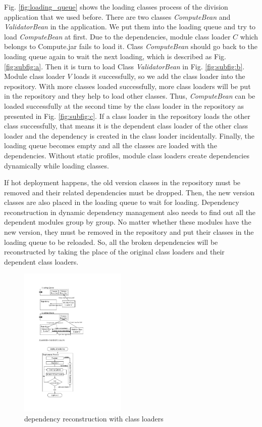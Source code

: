 \documentclass[conference]{IEEEtran}
\begin{document}
Fig. \ref{fig:loading_queue} shows the loading classes process of the division application that we used before. 
There are two classes \emph{ComputeBean} and \emph{ValidatorBean} in the application. 
We put them into the loading queue and try to load \emph{ComputeBean} at first. 
Due to the dependencies, module class loader $C$ which belongs to Compute.jar fails to load it. 
Class \emph{ComputeBean} should go back to the loading queue again to wait the next loading, which is described as Fig. \ref{fig:subfig:a}. 
Then it is turn to load Class \emph{ValidatorBean} in Fig. \ref{fig:subfig:b}. 
Module class loader $V$ loads it successfully, so we add the class loader into the repository. 
With more classes loaded successfully, more class loaders will be put in the repository and they help to load other classes. 
Thus, \emph{ComputeBean} can be loaded successfully at the second time by the class loader in the repository as presented in Fig. \ref{fig:subfig:c}.
If a class loader in the repository loads the other class successfully, that means it is the dependent class loader of the other class loader and the dependency is created in the class loader incidentally. 
Finally, the loading queue becomes empty and all the classes are loaded with the dependencies.
Without static profiles, module class loaders create dependencies dynamically while loading classes.

If hot deployment happens, the old version classes in the repository must be removed and their related dependencies must be dropped. 
Then, the new version classes are also placed in the loading queue to wait for loading. 
Dependency reconstruction in dynamic dependency management also needs to find out all the dependent modules group by group. 
No matter whether these modules have the new version, they must be removed in the repository and put their classes in the loading queue to be reloaded. 
So, all the broken dependencies will be reconstructed by taking the place of the original class loaders and their dependent class loaders. 

\begin{figure}[ht]
\centering
\includegraphics[width=2.0in]{ProcessReconstructionCL.pdf}
\caption{dependency reconstruction with class loaders}
\label{fig:reconstruction_CL}
\end{figure}
\end{document}
